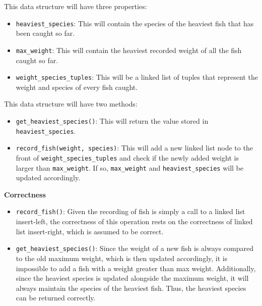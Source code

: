\documentclass[12pt,twoside]{article}
\begin{document}
\begin{problems}
\begin{problemparts}
\end{problemparts}

\newpage
\problem

\begin{problemparts}
 This data structure will have three
    properties:
    \begin{itemize}
        \item {\tt heaviest\_species}: This will contain the species of the
        heaviest fish that has been caught so far.
        \item {\tt max\_weight}: This will contain the heaviest recorded
        weight of all the fish caught so far.
        \item {\tt weight\_species\_tuples}: This will be a linked list of
        tuples that represent the weight and species of every fish caught.
    \end{itemize}
    This data structure will have two methods:
    \begin{itemize}
        \item {\tt get\_heaviest\_species()}: This will return the value
        stored in \\
        {\tt heaviest\_species}.
        \item {\tt record\_fish(weight, species)}: This will add a new
        linked list node to the front of {\tt weight\_species\_tuples} and
        check if the newly added weight is larger than {\tt max\_weight}. If
        so, {\tt max\_weight} and {\tt heaviest\_species} will be updated
        accordingly.
    \end{itemize}

    \smallbreak

    {\bf Correctness} 
    \begin{itemize}
        \item {\tt record\_fish()}: Given the recording of fish is simply a
        call to a linked list insert-left, the correctness of this operation
        rests on the correctness of linked list insert-right, which is
        assumed to be correct.
        \item {\tt get\_heaviest\_species()}: Since the weight of a new fish
        is always compared to the old maximum weight, which is then updated
        accordingly, it is impossible to add a fish with a weight greater
        than max weight. Additionally, since the heaviest species is updated
        alongside the maximum weight, it will always maintain the species of
        the heaviest fish. Thus, the heaviest species can be returned
        correctly.
    \end{itemize}


\end{problemparts}
\end{problems}
\end{document}
